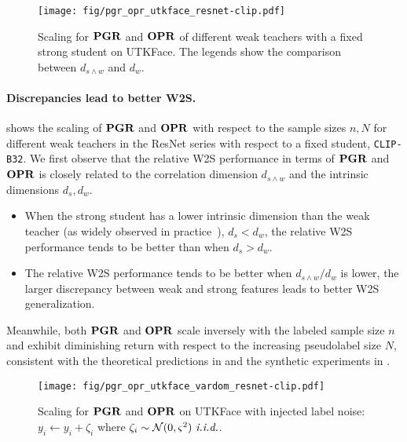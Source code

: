 \begin{figure}[!ht]
    \centering
    \texttt{[image: fig/pgr\_opr\_utkface\_resnet-clip.pdf]}%
    \caption{Scaling for $\mathbf{PGR}$ and $\mathbf{OPR}$ of different weak teachers with a fixed strong student on UTKFace. The legends show the comparison between $d_{s \wedge w}$ and $d_w$.}\label{fig:pgr_opr_utkface_resnet-clip}
\end{figure}

\paragraph{Discrepancies lead to better W2S.}
 shows the scaling of $\mathbf{PGR}$ and $\mathbf{OPR}$ with respect to the sample sizes $n, N$ for different weak teachers in the ResNet series with respect to a fixed student, \texttt{CLIP-B32}. 
We first observe that the relative W2S performance in terms of $\mathbf{PGR}$ and $\mathbf{OPR}$ is closely related to the correlation dimension $d_{s \wedge w}$ and the intrinsic dimensions $d_s, d_w$. 
\begin{itemize}
    \item When the strong student has a lower intrinsic dimension than the weak teacher (as widely observed in practice~\citep{aghajanyan2020intrinsic}), \ie $d_s < d_w$, the relative W2S performance tends to be better than when $d_s > d_w$.
    \item The relative W2S performance tends to be better when $d_{s \wedge w}/d_w$ is lower, \ie the larger discrepancy between weak and strong features leads to better W2S generalization.
\end{itemize}
Meanwhile, both $\mathbf{PGR}$ and $\mathbf{OPR}$ scale inversely with the labeled sample size $n$ and exhibit diminishing return with respect to the increasing pseudolabel size $N$, consistent with the theoretical predictions in  and the synthetic experiments in .

\begin{figure}[!ht]
    \centering
    \texttt{[image: fig/pgr\_opr\_utkface\_vardom\_resnet-clip.pdf]}%
    \caption{Scaling for $\mathbf{PGR}$ and $\mathbf{OPR}$ on UTKFace with injected label noise: $y_i \gets y_i + \zeta_i$ where $\zeta_i \sim \mathcal{N}(0, \varsigma^2)~\emph{i.i.d.}$.}\label{fig:pgr_opr_utkface_vardom_resnet-clip}
\end{figure}

